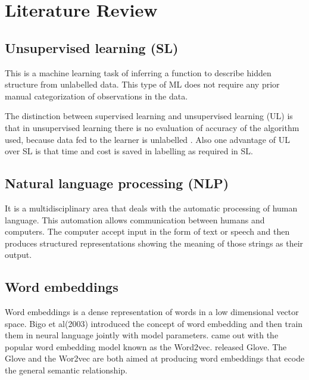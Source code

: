 \chapter{Literature Review}
\section{Unsupervised learning (SL)}
This is a machine learning task of inferring a function to describe hidden structure from unlabelled data. This type of ML does not require any prior manual categorization of observations in the data. 

The distinction between supervised learning and unsupervised learning (UL) is that in unsupervised learning there is no evaluation of accuracy of the algorithm used, because data fed to the learner is unlabelled . Also one advantage of UL over SL is that time and cost is saved in labelling as required in SL. 
\section{Natural language processing (NLP)}
It is a multidisciplinary area that deals with the automatic processing of human language. 
This automation allows communication between humans and computers. The computer accept input in the form of text or speech and then produces structured representations showing the meaning of those strings as their output.



\section{Word embeddings}
Word embeddings is a dense representation of words in a low dimensional vector space. Bigo et al(2003) introduced the  concept of word embedding and then train them in neural language jointly with model parameters. \citep{mikolov2013distributed} came out with the popular word embedding model known as the Word2vec. 
\cite{faruqui2014retrofitting} released Glove. The Glove and the Wor2vec are both aimed at producing word embeddings that ecode the general semantic relationship.
